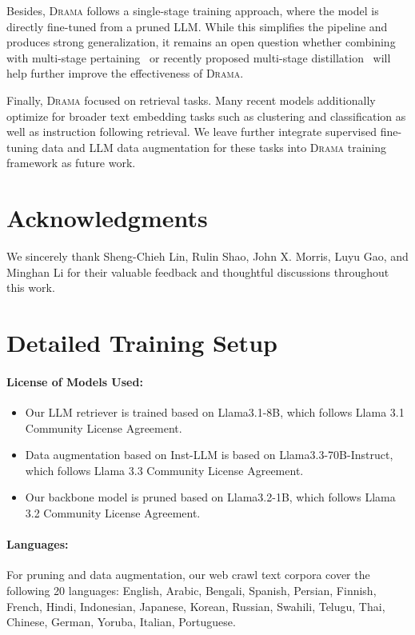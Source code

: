 \documentclass[]{fairmeta}
\newcommand{\ourmodel}{\textsc{Drama}}
\begin{document}
Besides, \ourmodel{} follows a single-stage training approach, where the model is directly fine-tuned from a pruned LLM.
While this simplifies the pipeline and produces strong generalization, it remains an open question whether combining with multi-stage pertaining~\citep{yu2024arcticembed} or recently proposed multi-stage distillation~\citep{zhang2025jasperstelladistillationsota} will help further improve the effectiveness of \ourmodel{}.

Finally, \ourmodel{} focused on retrieval tasks.
Many recent models additionally optimize for broader text embedding tasks such as clustering and classification as well as instruction following retrieval.
We leave further integrate supervised fine-tuning data and LLM data augmentation for these tasks into \ourmodel{} training framework as future work.

\section*{Acknowledgments}
We sincerely thank Sheng-Chieh Lin, Rulin Shao, John X. Morris, Luyu Gao, and Minghan Li for their valuable feedback and thoughtful discussions throughout this work.




\clearpage
\newpage
\beginappendix

\section{Detailed Training Setup}

\paragraph{License of Models Used:} 
\begin{itemize}
    \item Our LLM retriever is trained based on Llama3.1-8B, which follows Llama 3.1 Community License Agreement.
    \item Data augmentation based on Inst-LLM is based on Llama3.3-70B-Instruct, which follows Llama 3.3 Community License Agreement.
    \item Our backbone model is pruned based on Llama3.2-1B, which follows Llama 3.2 Community License Agreement.
\end{itemize}

\paragraph{Languages:} For pruning and data augmentation, our web crawl text corpora cover the following 20 languages:
English, Arabic, Bengali, Spanish, Persian, Finnish, French, Hindi, Indonesian, Japanese, Korean, Russian, Swahili, Telugu, Thai, Chinese, German, Yoruba, Italian, Portuguese.
\end{document}
